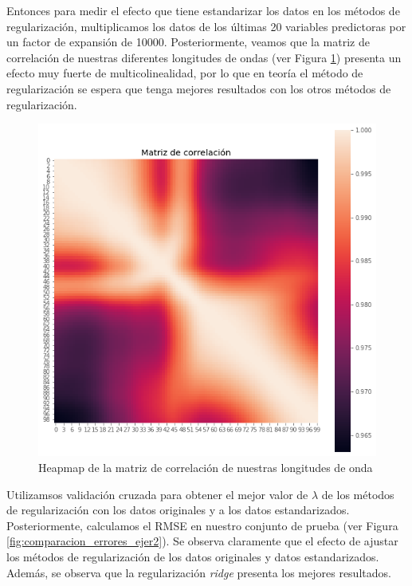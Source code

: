 \documentclass{article}
\begin{document}
Entonces para medir el efecto que tiene estandarizar los datos en los métodos de regularización, multiplicamos los datos de los últimas 20 variables predictoras por un factor de expansión de 10000. Posteriormente, veamos que la matriz de correlación de nuestras diferentes longitudes de ondas (ver Figura \ref{fig:matriz_cor_ejer2}) presenta un efecto muy fuerte de multicolinealidad, por lo que en teoría el método de regularización se espera que tenga mejores resultados con los otros métodos de regularización.  
\begin{figure}[H]
    \centering
    \includegraphics[scale=0.3]{figure/matriz_cor_ejer2.png}
    \caption{Heapmap de la matriz de correlación de nuestras longitudes de onda}
    \label{fig:matriz_cor_ejer2}
\end{figure}
Utilizamsos validación cruzada para obtener el mejor valor de $\lambda$ de los métodos de regularización con los datos originales y a los datos estandarizados. Posteriormente, calculamos el RMSE en nuestro conjunto de prueba (ver Figura \ref{fig:comparacion_errores_ejer2}). Se observa claramente que el efecto de ajustar los métodos de regularización de los datos originales y datos estandarizados. Además, se observa que la regularización \textit{ridge} presenta los mejores resultados. 
\end{document}
